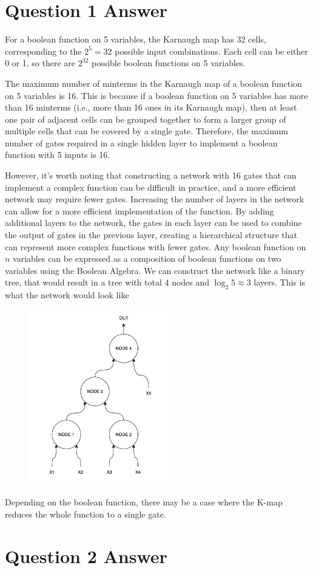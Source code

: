 \documentclass{article}
\begin{document}
\thispagestyle{firstpage}

\section*{Question 1 Answer}

For a boolean function on 5 variables, the Karnaugh map has 32 cells, corresponding to the $2^{5} = 32$ possible input combinations. Each cell can be either 0 or 1, so there are $2^{32}$ possible boolean functions on 5 variables.

The maximum number of minterms in the Karnaugh map of a boolean function on 5 variables is 16. This is because if a boolean function on 5 variables has more than 16 minterms (i.e., more than 16 ones in its Karnaugh map), then at least one pair of adjacent cells can be grouped together to form a larger group of multiple cells that can be covered by a single gate. Therefore, the maximum number of gates required in a single hidden layer to implement a boolean function with 5 inputs is 16.

However, it's worth noting that constructing a network with 16 gates that can implement a complex function can be difficult in practice, and a more efficient network may require fewer gates. Increasing the number of layers in the network can allow for a more efficient implementation of the function. By adding additional layers to the network, the gates in each layer can be used to combine the output of gates in the previous layer, creating a hierarchical structure that can represent more complex functions with fewer gates. Any boolean function on $n$ variables can be expressed as a composition of boolean functions on two variables using the Boolean Algebra. We can construct the network like a binary tree, that would result in a tree with total 4 nodes and $\log_{2} 5 \approx 3$ layers. This is what the network would look like 

\begin{figure}[H]
  \centering
  \includegraphics[width=2.5in]{images/network.png}
\end{figure}

Depending on the boolean function, there may be a case where the K-map reduces the whole function to a single gate.

\section*{Question 2 Answer}
\end{document}
